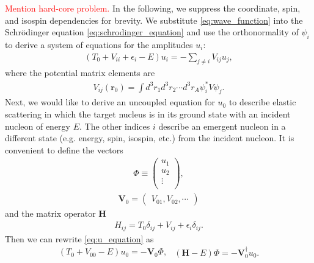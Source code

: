 \documentclass[preprintnumbers,floatfix,aps,prc,preprint,nofootinbib]{revtex4-1}
\begin{document}
%
\textcolor{red}{Mention hard-core problem.} In the following, we suppress the coordinate, spin, and isospin dependencies for brevity. We substitute \ref{eq:wave_function} into the Schr\"odinger equation \ref{eq:schrodinger_equation} and use the orthonormality of $\psi_i$ to derive a system of equations for the amplitudes $u_i$:
%
\begin{eqnarray}
	\label{eq:u_equation}
	(T_0 + V_{ii} + \epsilon_i - E) u_i = - \sum_{j \neq i} V_{ij} u_j,
\end{eqnarray}
%
where the potential matrix elements are
%
\begin{eqnarray}
	\label{eq:potential_matrix_elements}
	V_{ij}(\textbf{r}_0) = \int{d^3 r_1 d^3 r_2 \cdots d^3 r_A \psi_i^* V \psi_j}.
\end{eqnarray}
%
Next, we would like to derive an uncoupled equation for $u_0$ to describe elastic scattering in which the target nucleus is in its ground state with an incident nucleon of energy $E$. The other indices $i$ describe an emergent nucleon in a different state (e.g. energy, spin, isospin, etc.) from the incident nucleon. It is convenient to define the vectors
%
\begin{eqnarray}
	\label{eq:u_vector}
	\Phi \equiv
	\begin{pmatrix}
		u_1 \\
		u_2 \\
		\vdots \\
	\end{pmatrix}
	,
\end{eqnarray}
%
\begin{eqnarray}
	\label{eq:potential_vector}
	\textbf{V}_0 =
	\begin{pmatrix}
		V_{01}, V_{02}, \cdots
	\end{pmatrix}
\end{eqnarray}
%
and the matrix operator $\textbf{H}$
%
\begin{eqnarray}
	\label{eq:hamiltonian_operator}
	H_{ij} = T_0 \delta_{ij} + V_{ij} + \epsilon_i \delta_{ij}.
\end{eqnarray}
%
Then we can rewrite \ref{eq:u_equation} as
%
\begin{subequations}
	\label{eq:u_vector_equation}
	\begin{eqnarray}
		\label{eq:u_vector_equation_a}
		(T_0 + V_{00} - E) u_0 = -\textbf{V}_0 \Phi,
	\end{eqnarray}
	\begin{eqnarray}
		\label{eq:u_vector_equation_b}
		(\textbf{H}-E) \Phi = -\textbf{V}_0^{\dagger} u_0.
	\end{eqnarray}
\end{subequations}
\end{document}
